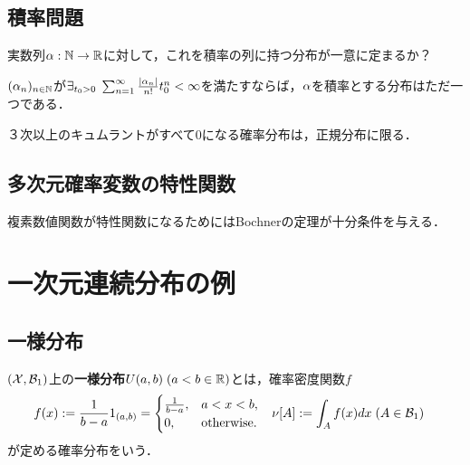 \documentclass[uplatex,dvipdfmx]{jsreport}
\begin{document}
\begin{example}
    
\end{example}

\subsection{積率問題}

\begin{problem}
    実数列$\alpha:\mathbb{N}\to\mathbb{R}$に対して，これを積率の列に持つ分布が一意に定まるか？
\end{problem}

\begin{theorem}[一意性の十分条件]
    $(\alpha_n)_{n\in\mathbb{N}}$が$\exists_{t_0>0}\;\sum^\infty_{n=1}\frac{\lvert\alpha_n\rvert}{n!}t^n_0<\infty$を満たすならば，$\alpha$を積率とする分布はただ一つである．
\end{theorem}

\begin{example}
    ３次以上のキュムラントがすべて$0$になる確率分布は，正規分布に限る．
\end{example}

\subsection{多次元確率変数の特性関数}

\begin{tcolorbox}[colframe=ForestGreen, colback=ForestGreen!10!white,breakable,colbacktitle=ForestGreen!40!white,coltitle=black,fonttitle=\bfseries\sffamily,
title=]
    複素数値関数が特性関数になるためにはBochnerの定理が十分条件を与える．
\end{tcolorbox}

\section{一次元連続分布の例}

\subsection{一様分布}

\begin{definition}
    $(\mathcal{X},\mathcal{B}_1)$上の\textbf{一様分布}$U(a,b)\;(a<b\in\mathbb{R})$とは，確率密度関数$f$
    \begin{align*}
        f(x)&:=\frac{1}{b-a}1_{(a,b)}=\begin{cases}
            \frac{1}{b-a},&a<x<b,\\
            0,&\mathrm{otherwise}.
        \end{cases}&\nu[A]&:=\int_Af(x)dx\;(A\in\mathcal{B}_1)
    \end{align*}
    が定める確率分布をいう．
\end{definition}
\end{document}
